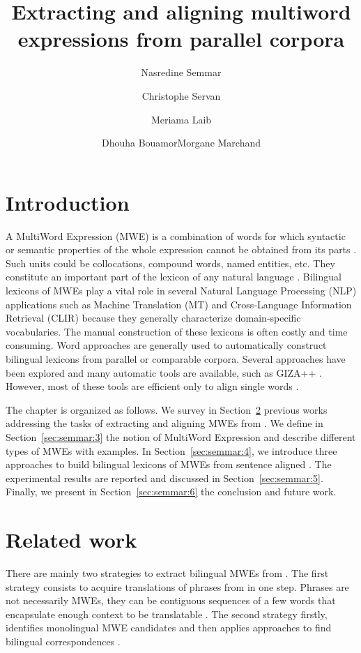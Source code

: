 \documentclass[output=paper,modfonts,nonflat]{langsci/langscibook}
\title{Extracting and aligning multiword expressions from parallel corpora}
\author{Nasredine Semmar\affiliation{CEA LIST, Vision and Content Engineering Laboratory}\and Christophe Servan\affiliation{University of Grenoble Alpes -- Grenoble Informatics Laboratory\\ SYSTRAN}\and Meriama Laib\affiliation{CEA LIST, Vision and Content Engineering Laboratory}\and Dhouha Bouamor\affiliation{Actimos, Groupe Accord}\lastand  Morgane Marchand\affiliation{eXenSa}}
\begin{document}
\maketitle

\section{Introduction}\label{sec:semmar:1}

A MultiWord Expression (MWE) is a combination of words for which syntactic or semantic properties of the whole expression cannot be obtained from its parts \citep{sag02}. Such units could be collocations, compound words, named entities, etc. They constitute an important part of the lexicon of any natural language \citep{jackendoff1997architecture}. Bilingual lexicons of MWEs play a vital role in several Natural Language Processing (NLP) applications such as Machine Translation (MT) and Cross-Language Information Retrieval (CLIR) because they generally characterize domain-specific vocabularies. The manual construction of these lexicons is often costly and time consuming. Word  approaches are generally used to automatically construct bilingual lexicons from parallel or comparable corpora. Several  approaches have been explored \citep{daille1994towards,blank2000terminology,barbu2004} and many automatic  tools are available, such as GIZA++ \citep{och2000improved}. However, most of these tools are efficient only to align single words \citep{fraser2007measuring}.

The chapter is organized as follows. We survey in Section~\ref{sec:semmar:2} previous works addressing the tasks of extracting and aligning MWEs from . We define in Section~\ref{sec:semmar:3} the notion of MultiWord Expression and describe different types of MWEs with examples.  In Section~\ref{sec:semmar:4}, we introduce three approaches to build bilingual lexicons of MWEs from sentence aligned . The experimental results are reported and discussed in Section~\ref{sec:semmar:5}. Finally, we present in Section~\ref{sec:semmar:6} the conclusion and future work.

\section{Related work}\label{sec:semmar:2}

There are mainly two strategies to extract bilingual MWEs from . The first strategy consists to acquire translations of phrases from  in one step. Phrases are not necessarily MWEs, they can be contiguous sequences of a few words that encapsulate enough context to be translatable \citep{denero2008complexity}. The second strategy firstly, identifies monolingual MWE candidates and then applies  approaches to find bilingual correspondences \citep{daille1994towards,blank2000terminology,gaussier2011modeles,barbu2004}. 
\end{document}
